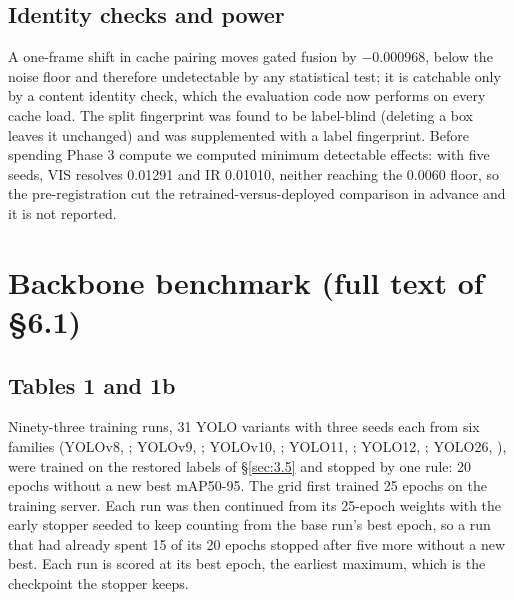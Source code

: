 \documentclass[10pt]{article}
\begin{document}
\subsection{Identity checks and power}\label{app:D.4}
A one-frame shift in cache pairing moves gated fusion by $-$0.000968, below the noise floor and therefore undetectable by any statistical test; it is catchable only by a content identity check, which the evaluation code now performs on every cache load. The split fingerprint was found to be label-blind (deleting a box leaves it unchanged) and was supplemented with a label fingerprint. Before spending Phase 3 compute we computed minimum detectable effects: with five seeds, VIS resolves 0.01291 and IR 0.01010, neither reaching the 0.0060 floor, so the pre-registration cut the retrained-versus-deployed comparison in advance and it is not reported.

\FloatBarrier
\section{Backbone benchmark (full text of \S6.1)}\label{app:E}
\subsection{Tables 1 and 1b}\label{app:E.1}
Ninety-three training runs, 31 YOLO variants with three seeds each from six families (YOLOv8, \citealp{jocher2023ultralytics}; YOLOv9, \citealp{wang2024yolov9}; YOLOv10, \citealp{wang2024yolov10}; YOLO11, \citealp{jocher2024ultralytics}; YOLO12, \citealp{tian2025yolov12}; YOLO26, \citealp{jocher2026ultralytics}), were trained on the restored labels of \S\ref{sec:3.5} and stopped by one rule: 20 epochs without a new best mAP50-95. The grid first trained 25 epochs on the training server. Each run was then continued from its 25-epoch weights with the early stopper seeded to keep counting from the base run's best epoch, so a run that had already spent 15 of its 20 epochs stopped after five more without a new best. Each run is scored at its best epoch, the earliest maximum, which is the checkpoint the stopper keeps.
\end{document}
